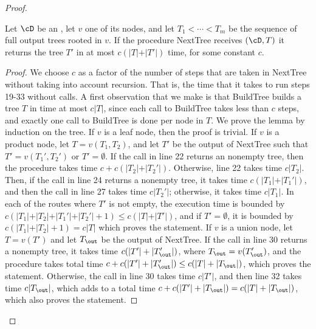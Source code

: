 \begin{proof}
	\begin{lemma}\label{appendix:next-tree-almost-linear-delay}
		Let $\cD$ be an \dsabbr, let $v$ one of its nodes, and let $T_1<\cdots<T_m$ be the sequence of full output trees rooted in $v$. If the procedure {\sc NextTree} receives $(\cD,T)$ it returns the tree $T'$ in at most $c(\vert T\vert + \vert T'\vert)$ time, for some constant $c$.
	\end{lemma}
	\begin{proof}
		We choose $c$ as a factor of the number of steps that are taken in {\sc NextTree} without taking into account recursion. That is, the time that it takes to run steps 19-33 without calls. A first observation that we make is that {\sc BuildTree} builds a tree $T$  in time at most $c\vert T\vert$, since each call to {\sc BuildTree} takes less than $c$ steps, and exactly one call to {\sc BuildTree} is done per node in $T$. We prove the lemma by induction on the tree. If $v$ is a leaf node, then the proof is trivial. If $v$ is a product node, let $T = v(T_1,T_2)$, and let $T'$ be the output of {\sc NextTree} such that $T' = v(T_1',T_2')$ or $T' = \emptyset$. If the call in line 22 returns an nonempty tree, then the procedure takes time $c + c(\vert T_2\vert + \vert T_2'\vert)$. Otherwise, line 22 takes time $c\vert T_2\vert$. Then, if the call in line 24 returns a nonempty tree, it takes time $c(\vert T_1\vert + \vert T_1'\vert)$, and then the call in line 27 takes time $c\vert T_2'\vert$; otherwise, it takes time $c\vert T_1\vert$. In each of the routes where $T'$ is not empty, the execution time is bounded by $c(\vert T_1\vert + \vert T_2\vert + \vert T_1'\vert + \vert T_2'\vert+1) \leq c(\vert T\vert + \vert T' \vert)$, and if $T' = \emptyset$, it is bounded by $c(\vert T_1\vert + \vert T_2\vert + 1) = c\vert T\vert$ which proves the statement. If $v$ is a union node, let $T = v(T')$ and let $T_{\out}$ be the output of {\sc NextTree}. If the call in line 30 returns a nonempty tree, it takes time $c(\vert T'\vert + \vert T_{\out}'\vert)$, where $T_{\out} = v(T_{\out}')$, and the procedure takes total time $c + c(\vert T'\vert + \vert T_{\out}'\vert)\leq c(\vert T\vert + \vert T_{\out}\vert)$, which proves the statement. Otherwise,  the call in line 30 takes time $c\vert T'\vert$, and then line 32 takes time $c\vert T_{\out}\vert$, which adds to a total time $c + c(\vert T'\vert + \vert T_{\out}\vert)= c(\vert T\vert + \vert T_{\out}\vert)$, which also proves the statement.
	\end{proof}
	

\end{proof}
